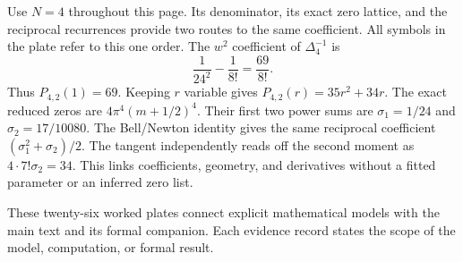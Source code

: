 Use $N=4$ throughout this page. Its denominator, its exact zero lattice, and the reciprocal recurrences provide two routes to the same coefficient. All symbols in the plate refer to this one order.
The $w^2$ coefficient of $\Delta_4^{-1}$ is
\[
\frac1{24^2}-\frac1{8!}=\frac{69}{8!}.
\]
Thus $P_{4,2}(1)=69$. Keeping $r$ variable gives $P_{4,2}(r)=35r^2+34r$.
The exact reduced zeros are $4\pi^4(m+1/2)^4$. Their first two power sums are $\sigma_1=1/24$ and $\sigma_2=17/10080$. The Bell/Newton identity gives the same reciprocal coefficient $(\sigma_1^2+\sigma_2)/2$. The tangent independently reads off the second moment as $4\cdot7!\sigma_2=34$.
This links coefficients, geometry, and derivatives without a fitted parameter or an inferred zero list.

These twenty-six worked plates connect explicit mathematical models with the main text and its formal companion. Each evidence record states the scope of the model, computation, or formal result.

